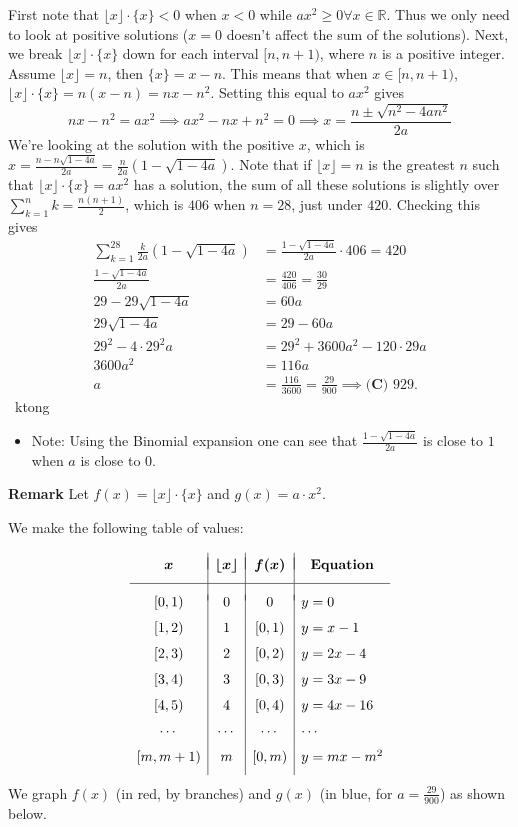 \begin{enumerate}
First note that $\lfloor x\rfloor \cdot \{x\}<0$ when $x<0$ while $ax^2\ge 0\forall x\in \mathbb{R}$. Thus we only need to look at positive solutions ($x=0$ doesn't affect the sum of the solutions). Next, we break $\lfloor x\rfloor\cdot \{x\}$ down for each interval $[n,n+1)$, where $n$ is a positive integer. Assume $\lfloor x\rfloor=n$, then $\{x\}=x-n$. This means that when $x\in [n,n+1)$, $\lfloor x\rfloor \cdot \{x\}=n(x-n)=nx-n^2$. Setting this equal to $ax^2$ gives 
 \[nx-n^2=ax^2\implies ax^2-nx+n^2=0 \implies x=\frac{n\pm \sqrt{n^2-4an^2}}{2a}\]We're looking at the solution with the positive $x$, which is $x=\frac{n-n\sqrt{1-4a}}{2a}=\frac{n}{2a}\left(1-\sqrt{1-4a}\right)$. Note that if $\lfloor x\rfloor=n$ is the greatest $n$ such that $\lfloor x\rfloor \cdot \{x\}=ax^2$ has a solution, the sum of all these solutions is slightly over $\sum_{k=1}^{n}k=\frac{n(n+1)}{2}$, which is $406$ when $n=28$, just under $420$. Checking this gives 
 \begin{align*} \sum_{k=1}^{28}\frac{k}{2a}\left(1-\sqrt{1-4a}\right)&=\frac{1-\sqrt{1-4a}}{2a}\cdot 406=420 \\ \frac{1-\sqrt{1-4a}}{2a}&=\frac{420}{406}=\frac{30}{29} \\ 29-29\sqrt{1-4a}&=60a \\ 29\sqrt{1-4a}&=29-60a \\ 29^2-4\cdot 29^2a&=29^2+3600a^2-120\cdot 29a \\ 3600a^2&=116a \\ a&=\frac{116}{3600}=\frac{29}{900} \implies \boxed{\textbf{(C) } 929}. \end{align*}
~ktong

 
            \begin{itemize}
        \item Note: Using the Binomial expansion one can see that $\frac{1-\sqrt{1-4a}}{2a}$ is close to $1$ when $a$ is close to $0$.
            \end{itemize}
            \textbf{Remark} Let $f(x)=\lfloor x \rfloor \cdot \{x\}$ and $g(x)=a \cdot x^2.$

 We make the following table of values:

 
 \[\begin{array}{c|c|c|l} & & & \\ [-2ex] \boldsymbol{x} & \boldsymbol{\lfloor x \rfloor} & \boldsymbol{f(x)} & \multicolumn{1}{c}{\textbf{Equation}} \\ [1.5ex] \hline & & & \\ [-1ex] [0,1) & 0 & 0 & y=0 \\ [1.5ex] [1,2) & 1 & [0,1) & y=x-1 \\ [1.5ex] [2,3) & 2 & [0,2) & y=2x-4 \\ [1.5ex] [3,4) & 3 & [0,3) & y=3x-9 \\ [1.5ex] [4,5) & 4 & [0,4) & y=4x-16 \\ [1.5ex] \cdots & \cdots & \cdots & \cdots \\ [1.5ex] [m,m+1) & m & [0,m) & y=mx-m^2 \\ [1.5ex] \end{array}\]We graph $f(x)$ (in red, by branches) and $g(x)$ (in blue, for $a=\frac{29}{900}$) as shown below.


\end{enumerate}
